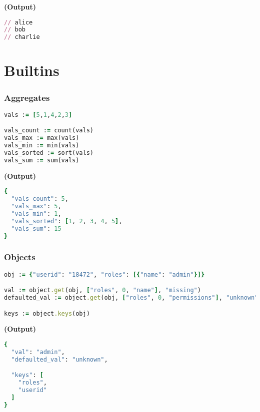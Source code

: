 \documentclass[twocolumn]{article}
\begin{document}
\textbf{\tiny{(Output)}}
\begin{lstlisting}[language=Ruby]
// alice
// bob
// charlie

\end{lstlisting}




\section*{Builtins}




\vspace{-1em}
\subsubsection*{Aggregates}

\begin{lstlisting}[language=Ruby]
vals := [5,1,4,2,3]

vals_count := count(vals)
vals_max := max(vals)
vals_min := min(vals)
vals_sorted := sort(vals)
vals_sum := sum(vals)
\end{lstlisting}



\textbf{\tiny{(Output)}}
\begin{lstlisting}[language=Ruby]
{
  "vals_count": 5,
  "vals_max": 5,
  "vals_min": 1,
  "vals_sorted": [1, 2, 3, 4, 5],
  "vals_sum": 15
}
\end{lstlisting}



\vspace{-1em}
\subsubsection*{Objects}

\begin{lstlisting}[language=Ruby]
obj := {"userid": "18472", "roles": [{"name": "admin"}]}

val := object.get(obj, ["roles", 0, "name"], "missing")
defaulted_val := object.get(obj, ["roles", 0, "permissions"], "unknown")

keys := object.keys(obj)
\end{lstlisting}



\textbf{\tiny{(Output)}}
\begin{lstlisting}[language=Ruby]
{
  "val": "admin",
  "defaulted_val": "unknown",

  "keys": [
    "roles",
    "userid"
  ]
}
\end{lstlisting}
\end{document}
